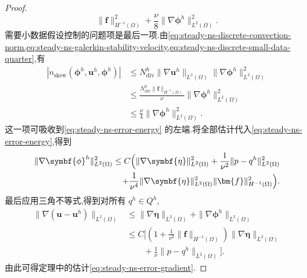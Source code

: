 \begin{proof}
\[          \|\bm{f}\|_{H^{-1}(\Omega)}^2
       +\frac{\nu}{8}\|\nabla\symbf{\phi}^h\|_{L^2(\Omega)}^2.
\]
需要小数据假设控制的问题项是最后一项.由\cref{eq:steady-ns-discrete-convection-norm,eq:steady-ns-galerkin-stability-velocity,eq:steady-ns-discrete-small-data-quarter},有
\[
\begin{aligned}
 |n_{\mathrm{skew}}(\symbf{\phi}^h,\bm{u}^h,\symbf{\phi}^h)|
   &\le N_{\mathrm{div}}^h
       \|\nabla\bm{u}^h\|_{L^2(\Omega)}
       \|\nabla\symbf{\phi}^h\|_{L^2(\Omega)}^2\\
   &\le\frac{N_{\mathrm{div}}^h\|\bm{f}\|_{H^{-1}(\Omega)}}{\nu}
       \|\nabla\symbf{\phi}^h\|_{L^2(\Omega)}^2\\
   &\le\frac{\nu}{4}
       \|\nabla\symbf{\phi}^h\|_{L^2(\Omega)}^2.
\end{aligned}
\]
这一项可吸收到\cref{eq:steady-ns-error-energy} 的左端.将全部估计代入\cref{eq:steady-ns-error-energy},得到
\[
\begin{aligned}
  \|\nabla\symbf{\phi}^h\|_{L^2(\Omega)}^2
   \le C\Bigl(
      \|\nabla\symbf{\eta}\|_{L^2(\Omega)}^2
      +\frac1{\nu^2}\|p-q^h\|_{L^2(\Omega)}^2\\
      +\frac1{\nu^4}\|\nabla\symbf{\eta}\|_{L^2(\Omega)}^2
          \|\bm{f}\|_{H^{-1}(\Omega)}^2\Bigr).
\end{aligned}
\]
最后应用三角不等式,得到对所有 $q^h\in Q^h$,
\[
\begin{aligned}
  \|\nabla(\bm{u}-\bm{u}^h)\|_{L^2(\Omega)}
   &\le\|\nabla\symbf{\eta}\|_{L^2(\Omega)}
       +\|\nabla\symbf{\phi}^h\|_{L^2(\Omega)}\\
    &\le C\Biggl[
        \left(1+\frac1{\nu^2}\|\bm{f}\|_{H^{-1}(\Omega)}\right)
        \|\nabla\symbf{\eta}\|_{L^2(\Omega)}\\
    &\qquad+\frac1\nu\|p-q^h\|_{L^2(\Omega)}\Biggr].
\end{aligned}
\]
由此可得定理中的估计\cref{eq:steady-ns-error-gradient}.
\end{proof}

